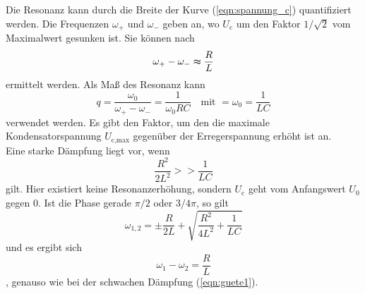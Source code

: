 Die Resonanz kann durch die Breite der Kurve (\autoref{eqn:spannung_c}) quantifiziert werden.
Die Frequenzen $\omega_+$ und $\omega_-$ geben an, wo $U_\text{c}$ um den Faktor $1/\sqrt{2}$ vom Maximalwert gesunken ist.
Sie können nach
\begin{equation}
    \omega_+ - \omega_- \thickapprox \frac{R}{L}
    \label{eqn:guete1}
\end{equation}
ermittelt werden. Als Maß des Resonanz kann 
\begin{equation}
    q = \frac{\omega_0}{\omega_+ - \omega_-} = \frac{1}{\omega_0RC} \quad \text{mit } = \omega_0 = \frac{1}{LC}
\end{equation}
verwendet werden. Es gibt den Faktor, um den die maximale Kondensatorspannung $U_\text{c,max}$ gegenüber der Erregerspannung erhöht ist an.
\\
Eine starke Dämpfung liegt vor, wenn
\begin{equation*}
    \frac{R^2}{2L^2} >> \frac{1}{LC}
\end{equation*}
gilt. Hier existiert keine Resonanzerhöhung, sondern $U_\text{c}$ geht vom Anfangswert $U_0$ gegen 0.
Ist die Phase gerade $\pi/2$ oder $3/4 \pi$, so gilt
\begin{equation}
    \omega_{1,2} = \pm \frac{R}{2L} + \sqrt{\frac{R^2}{4L^2} + \frac{1}{LC}} 
\end{equation}
und es ergibt sich
\begin{equation*}
    \omega_1 - \omega_2 = \frac{R}{L}
\end{equation*}
, genauso wie bei der schwachen Dämpfung (\autoref{eqn:guete1}).